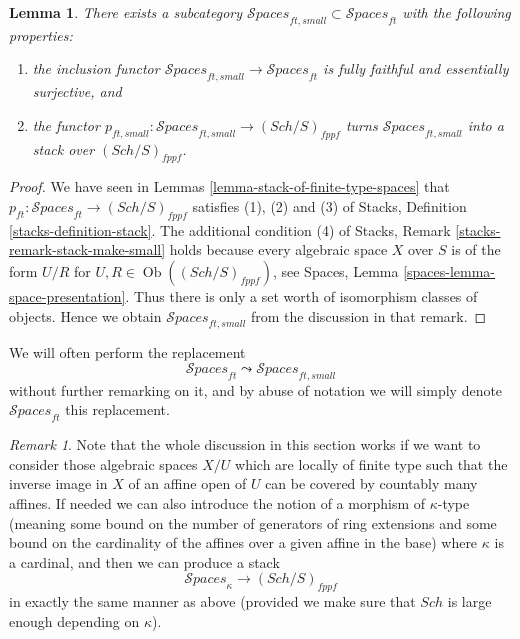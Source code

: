 \documentclass{stacks-project}
\theoremstyle{plain}
\newtheorem{lemma}[subsection]{Lemma}
\theoremstyle{definition}
\theoremstyle{remark}
\newtheorem{remark}[subsection]{Remark}
\numberwithin{equation}{subsection}
\def\Sch{\mathit{Sch}}
\def\Ob{\mathop{\mathrm{Ob}}\nolimits}
\def\Spacesstack{\mathcal{S}\!\mathit{paces}}
\begin{document}
\begin{lemma}
\label{lemma-stack-ft-spaces}
There exists a subcategory
$\Spacesstack_{ft, small} \subset \Spacesstack_{ft}$
with the following properties:
\begin{enumerate}
\item the inclusion functor
$\Spacesstack_{ft, small} \to \Spacesstack_{ft}$ is
fully faithful and essentially surjective, and
\item the functor
$p_{ft, small} : \Spacesstack_{ft, small} \to (\Sch/S)_{fppf}$
turns $\Spacesstack_{ft, small}$ into a stack over
$(\Sch/S)_{fppf}$.
\end{enumerate}
\end{lemma}

\begin{proof}
We have seen in
Lemmas \ref{lemma-stack-of-finite-type-spaces}
that $p_{ft} : \Spacesstack_{ft} \to (\Sch/S)_{fppf}$
satisfies (1), (2) and (3) of
Stacks, Definition \ref{stacks-definition-stack}.
The additional condition (4) of
Stacks, Remark \ref{stacks-remark-stack-make-small}
holds because every algebraic space $X$ over $S$ is of the
form $U/R$ for $U, R \in \Ob((\Sch/S)_{fppf})$, see
Spaces, Lemma \ref{spaces-lemma-space-presentation}.
Thus there is only a set worth of isomorphism classes of objects.
Hence we obtain $\Spacesstack_{ft, small}$ from the discussion
in that remark.
\end{proof}

\noindent
We will often perform the replacement
$$
\Spacesstack_{ft} \leadsto \Spacesstack_{ft, small}
$$
without further remarking on it, and by abuse of notation we will
simply denote $\Spacesstack_{ft}$ this replacement.

\begin{remark}
\label{remark-higher-cardinality-spaces}
Note that the whole discussion in this section works
if we want to consider those algebraic spaces $X/U$ which are
locally of finite type such that the inverse image in $X$ of an affine open
of $U$ can be covered by countably many affines.
If needed we can also introduce the notion of a morphism of
$\kappa$-type (meaning some bound on the number of generators of
ring extensions and some bound on the cardinality of the affines over
a given affine in the base) where $\kappa$ is a cardinal, and then
we can produce a stack
$$
\Spacesstack_\kappa \longrightarrow (\Sch/S)_{fppf}
$$
in exactly the same manner as above (provided we make sure that
$\Sch$ is large enough depending on $\kappa$).
\end{remark}
\end{document}
